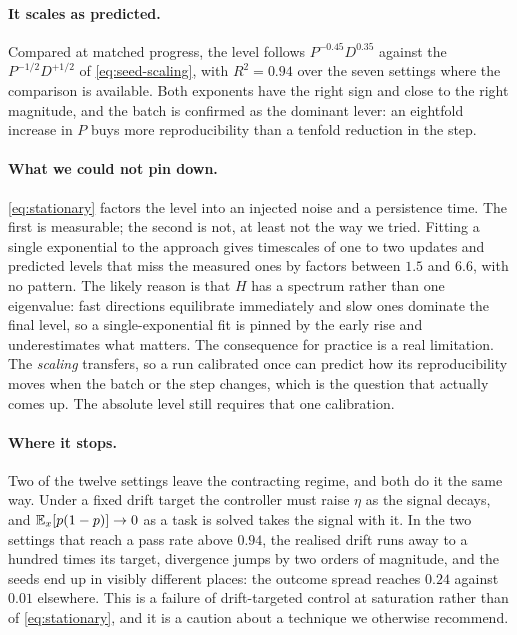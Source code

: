 \paragraph{It scales as predicted.} Compared at matched progress, the level follows
$P^{-0.45}D^{0.35}$ against the $P^{-1/2}D^{+1/2}$ of \eqref{eq:seed-scaling}, with $R^2 = 0.94$
over the seven settings where the comparison is available. Both exponents have the right sign and
close to the right magnitude, and the batch is confirmed as the dominant lever: an eightfold
increase in $P$ buys more reproducibility than a tenfold reduction in the step.

\paragraph{What we could not pin down.} \eqref{eq:stationary} factors the level into an injected
noise and a persistence time. The first is measurable; the second is not, at least not the way we
tried. Fitting a single exponential to the approach gives timescales of one to two updates and
predicted levels that miss the measured ones by factors between $1.5$ and $6.6$, with no pattern.
The likely reason is that $H$ has a spectrum rather than one eigenvalue: fast directions equilibrate
immediately and slow ones dominate the final level, so a single-exponential fit is pinned by the
early rise and underestimates what matters. The consequence for practice is a real limitation. The
\emph{scaling} transfers, so a run calibrated once can predict how its reproducibility moves when
the batch or the step changes, which is the question that actually comes up. The absolute level
still requires that one calibration.

\paragraph{Where it stops.} Two of the twelve settings leave the contracting regime, and both do it
the same way. Under a fixed drift target the controller must raise $\eta$ as the signal decays, and
$\mathbb{E}_x[p(1-p)] \to 0$ as a task is solved takes the signal with it. In the two settings that reach a
pass rate above $0.94$, the realised drift runs away to a hundred times its target, divergence jumps
by two orders of magnitude, and the seeds end up in visibly different places: the outcome spread
reaches $0.24$ against $0.01$ elsewhere. This is a failure of drift-targeted control at saturation
rather than of \eqref{eq:stationary}, and it is a caution about a technique we otherwise recommend.

